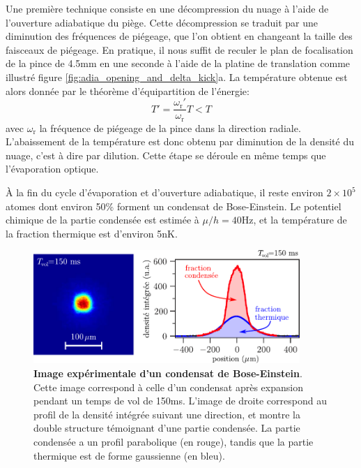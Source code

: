 Une première technique consiste en une décompression du nuage à l'aide de l'ouverture adiabatique du piège. Cette décompression se traduit par une diminution des fréquences de piégeage, que l'on obtient en changeant la taille des faisceaux de piégeage. En pratique, il nous suffit de reculer le plan de focalisation de la pince de 4.5mm en une seconde à l'aide de la platine de translation comme illustré figure \ref{fig:adia_opening_and_delta_kick}a. La température obtenue est alors donnée par le théorème d'équipartition de l'énergie:
\begin{equation}
T'=\frac{\omega_{\mathrm{r}}'}{\omega_{\mathrm{r}}}T < T
\end{equation}
avec $\omega_{\mathrm{r}}$ la fréquence de piégeage de la pince dans la direction radiale. L'abaissement de la température est donc obtenu par diminution de la densité du nuage, c'est à dire par dilution. Cette étape se déroule en même temps que l'évaporation optique.

À la fin du cycle d'évaporation et d'ouverture adiabatique, il reste environ $2 \times 10^5$ atomes dont environ 50\% forment un condensat de Bose-Einstein. Le potentiel chimique de la partie condensée est estimée à $\mu/h=40$Hz, et la température de la fraction thermique est d'environ 5nK. 

\begin{figure}
\centering
\includegraphics[width=0.9\textwidth]{Fig/BEC_manip/BEC_double_struct.pdf}
\caption{\textbf{Image expérimentale d'un condensat de Bose-Einstein}. Cette image correspond à celle d'un condensat après expansion pendant un temps de vol de 150ms. L'image de droite correspond au profil de la densité intégrée suivant une direction, et montre la double structure témoignant d'une partie condensée. La partie condensée a un profil parabolique (en rouge), tandis que la partie thermique est de forme gaussienne (en bleu).}
\label{fig:BEC_double_struct}
\end{figure}

